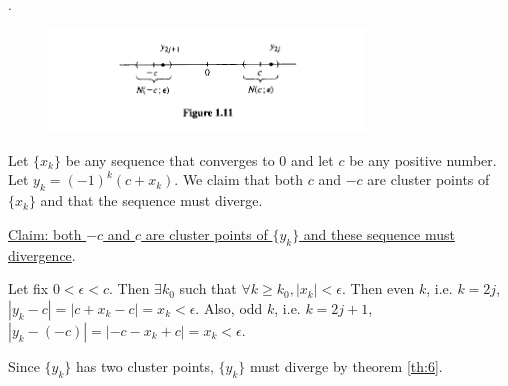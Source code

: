 \documentclass[8pt]{beamer}
\newcommand{\abs}[1]{\left\lvert #1 \right\rvert}
\begin{document}
\begin{frame}{.}
    \begin{figure}
        \includegraphics[width=0.75\textwidth]{example1.3.15.png}
    \end{figure}
    \begin{example}
        Let $\{x_k\}$ be any sequence that converges to $0$ and let $c$ be any positive number.
        Let $y_k = (-1)^k(c+x_k)$.
        We claim that both $c$ and $-c$ are cluster points of $\{x_k\}$ and that the sequence must diverge.

        \underline{Claim: both $-c$ and $c$ are cluster points of $\{y_k\}$ and these sequence must divergence}.

        Let fix $0< \epsilon < c$. Then $\exists k_0$ such that $\forall k \geq k_0, \abs{x_k} < \epsilon$.
        Then even $k$, i.e. $k=2j$, $\abs{y_k - c} = \abs{c + x_k - c} = x_k < \epsilon$.
        Also, odd $k$, i.e. $k=2j+1$, $\abs{y_k - (-c)} = \abs{-c -x_k + c} = x_k < \epsilon$.

        Since $\{y_k\}$ has two cluster points, $\{y_k\}$ must diverge by theorem \ref{th:6}.
    \end{example}
\end{frame}
\end{document}
